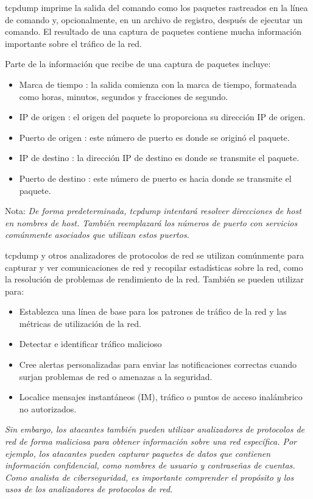 tcpdump imprime la salida del comando como los paquetes rastreados en la línea de comando y, opcionalmente, en un archivo de registro, después de ejecutar un comando. El resultado de una captura de paquetes contiene mucha información importante sobre el tráfico de la red. 


Parte de la información que recibe de una captura de paquetes incluye: 

\begin{itemize}
    \item Marca de tiempo : la salida comienza con la marca de tiempo, formateada como horas, minutos, segundos y fracciones de segundo.  

    \item IP de origen : el origen del paquete lo proporciona su dirección IP de origen.

    \item Puerto de origen : este número de puerto es donde se originó el paquete.

    \item IP de destino : la dirección IP de destino es donde se transmite el paquete.

    \item Puerto de destino : este número de puerto es hacia donde se transmite el paquete.
\end{itemize}
Nota: \textit{De forma predeterminada, tcpdump intentará resolver direcciones de host en nombres de host. También reemplazará los números de puerto con servicios comúnmente asociados que utilizan estos puertos.}


tcpdump y otros analizadores de protocolos de red se utilizan comúnmente para capturar y ver comunicaciones de red y recopilar estadísticas sobre la red, como la resolución de problemas de rendimiento de la red. También se pueden utilizar para:
\begin{itemize}
    \item Establezca una línea de base para los patrones de tráfico de la red y las métricas de utilización de la red.

    \item Detectar e identificar tráfico malicioso

    \item Cree alertas personalizadas para enviar las notificaciones correctas cuando surjan problemas de red o amenazas a la seguridad.

    \item Localice mensajes instantáneos (IM), tráfico o puntos de acceso inalámbrico no autorizados.
\end{itemize}
\textit{Sin embargo, los atacantes también pueden utilizar analizadores de protocolos de red de forma maliciosa para obtener información sobre una red específica. Por ejemplo, los atacantes pueden capturar paquetes de datos que contienen información confidencial, como nombres de usuario y contraseñas de cuentas. Como analista de ciberseguridad, es importante comprender el propósito y los usos de los analizadores de protocolos de red. }


